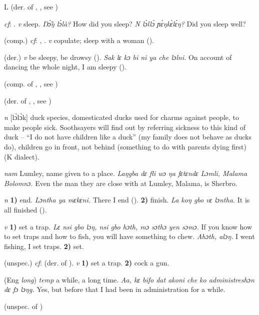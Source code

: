 \begin{letter}{L}
 (der. of , , see ) 

 \textit{cf}: . \textit{v} sleep. \textit{Ŋɔ̃́ŋ lɔ̀là?} How did you sleep? \textit{N lɔ̀llɔ́ ɲɛ̀ŋkɛ̀lɛ́ŋ?} Did you sleep well?

 (comp.) \textit{cf}: , . \textit{v} copulate; sleep with a woman (\citealt{Pichl1967}). 

 (der.) \textit{v} be sleepy, be drowsy (\citealt{Pichl1967}). \textit{Sak lɛ kɔ bi ni ya che lɔlni.} On account of dancing the whole night, I am sleepy (\citealt{Pichl1967}). 

 (comp. of , , see ) 

 (der. of , , see ) 

 \textit{n} [lɔ̀lɔ̀k] duck species, domesticated ducks used for charms against people, to make people sick. Soothsayers will find out by referring sickness to this kind of duck – “I do not have children like a duck” (my family does not behave as ducks do), children go in front, not behind (something to do with parents dying first) (K dialect). 

 \textit{nam} Lumley, name given to a place. \textit{Laŋgba dɛ fli wɔ ŋa fɛtɛndɛ Lɔmli, Malama Bolomnɔ.} Even the man they are close with at Lumley, Malama, is Sherbro.

 \textit{n} \textbf{1)} end. \textit{Lɔntha ya mɛkɛni.} There I end (\citealt{Pichl1967}). \textbf{2)} finish. \textit{La koŋ gbo vɛ lɔntha.} It is all finished (\citealt{Pichl1967}). 

 \textit{v} \textbf{1)} set a trap. \textit{Lɛ nsi gbo lɔŋ, nsi gbo hɔth, mɔ sɔthɔ yen sɔmɔ.} If you know how to set traps and how to fish, you will have something to chew. \textit{Ahɔth, alɔŋ.} I went fishing, I set traps. \textbf{2)} set.

 (unspec.) \textit{cf}:  (der. of ). \textit{v} \textbf{1)} set a trap. \textbf{2)} cock a gun.

 (Eng \textit{long}) \textit{temp} a while, a long time. \textit{Aa, kɛ bifo dat akoni che ko administreshɔn dɛ fɔ lɔŋg.} Yes, but before that I had been in administration for a while.

 (unspec. of ) 


\end{letter}
